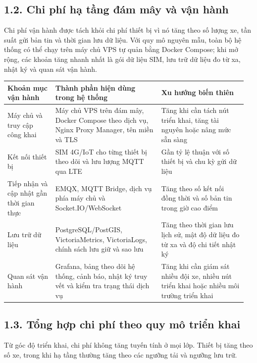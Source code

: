 \documentclass[a4paper]{extarticle}
\newcounter{none} %
\begin{document}
\subsection{1.2. Chi phí hạ tầng đám mây và vận hành}\label{app1-cloud-cost-cap-nhat}

Chi phí vận hành được tách khỏi chi phí thiết bị vì nó tăng theo số lượng xe,
tần suất gửi bản tin và thời gian lưu dữ liệu. Với quy mô nguyên mẫu, toàn bộ
hệ thống có thể chạy trên máy chủ VPS tự quản bằng Docker Compose; khi mở rộng,
các khoản tăng nhanh nhất là gói dữ liệu SIM, lưu trữ dữ liệu đo từ xa, nhật ký
và quan sát vận hành.

{\def\LTcaptype{none} %
\begin{longtable}{|L{0.190\linewidth}|L{0.425\linewidth}|L{0.345\linewidth}|}
\hline
\textbf{Khoản mục vận hành} & \textbf{Thành phần hiện dùng trong hệ thống} & \textbf{Xu hướng biến thiên} \\
\hline
\endhead
\endfoot
\endlastfoot
Máy chủ và truy cập công khai & Máy chủ VPS trên đám mây, Docker Compose theo dịch vụ, Nginx Proxy Manager, tên miền và TLS & Tăng khi cần tách nút triển khai, tăng tài nguyên hoặc nâng mức sẵn sàng \\\hline
Kết nối thiết bị & SIM 4G/IoT cho từng thiết bị theo dõi và lưu lượng MQTT qua LTE & Gần tỷ lệ thuận với số thiết bị và chu kỳ gửi dữ liệu \\\hline
Tiếp nhận và cập nhật gần thời gian thực & EMQX, MQTT Bridge, dịch vụ phía máy chủ và Socket.IO/WebSocket & Tăng theo số kết nối đồng thời và số bản tin trong giờ cao điểm \\\hline
Lưu trữ dữ liệu & PostgreSQL/PostGIS, VictoriaMetrics, VictoriaLogs, chính sách lưu giữ và sao lưu & Tăng theo thời gian lưu lịch sử, mật độ dữ liệu đo từ xa và độ chi tiết nhật ký \\\hline
Quan sát vận hành & Grafana, bảng theo dõi hệ thống, cảnh báo, nhật ký truy vết và kiểm tra trạng thái dịch vụ & Tăng khi cần giám sát nhiều đội xe, nhiều nút triển khai hoặc nhiều môi trường triển khai \\\hline
\end{longtable}
}

\subsection{1.3. Tổng hợp chi phí theo quy mô triển khai}\label{app1-scale-cost-cap-nhat}

Từ góc độ triển khai, chi phí không tăng tuyến tính ở mọi lớp. Thiết bị tăng
theo số xe, trong khi hạ tầng thường tăng theo các ngưỡng tải và ngưỡng lưu trữ.
\end{document}
